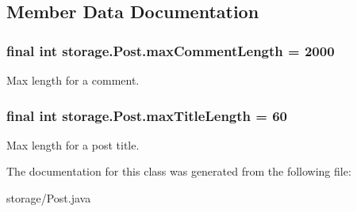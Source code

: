 \subsection{\-Member \-Data \-Documentation}
\hypertarget{classstorage_1_1_post_ae1acd6948113e41abaac3746752316cd}{
\subsubsection[{max\-Comment\-Length}]{\setlength{\rightskip}{0pt plus 5cm}final int {\bf storage.\-Post.\-max\-Comment\-Length} = 2000}}
\label{classstorage_1_1_post_ae1acd6948113e41abaac3746752316cd}
\-Max length for a comment. \hypertarget{classstorage_1_1_post_aca0ef12aa167eb825a44deac4601aeac}{
\subsubsection[{max\-Title\-Length}]{\setlength{\rightskip}{0pt plus 5cm}final int {\bf storage.\-Post.\-max\-Title\-Length} = 60}}
\label{classstorage_1_1_post_aca0ef12aa167eb825a44deac4601aeac}
\-Max length for a post title. 

\-The documentation for this class was generated from the following file\-:\begin{DoxyCompactItemize}
\item 
storage/\-Post.\-java\end{DoxyCompactItemize}
